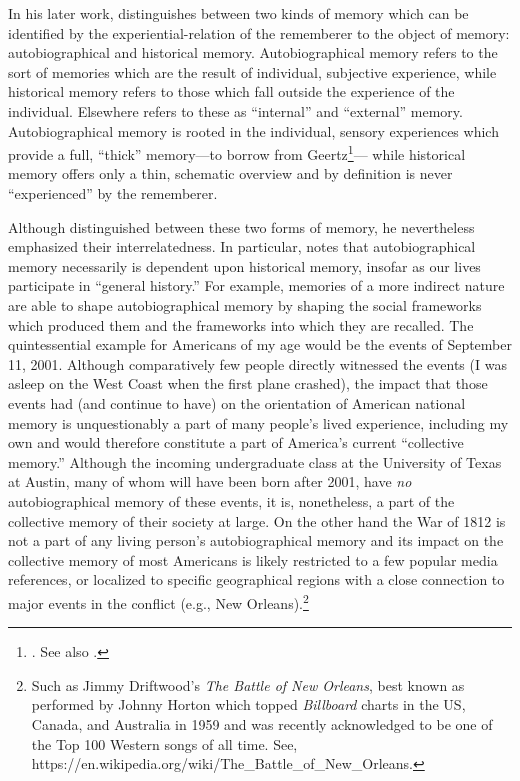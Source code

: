 In his later work, \halbwachs distinguishes between two kinds of memory which can be identified by the experiential-relation of the rememberer to the object of memory: autobiographical and historical memory.\autocite[52]{halbwachs1980} Autobiographical memory refers to the sort of memories which are the result of individual, subjective experience, while historical memory refers to those which fall outside the experience of the individual. Elsewhere \halbwachs refers to these as ``internal'' and ``external'' memory. Autobiographical memory is rooted in the individual, sensory experiences which provide a full, ``thick'' memory---to borrow from Geertz\footnote{\cite[3--30]{geertz1973}. See also \cite[189--192]{smith-riley2009}.}--- while historical memory offers only a thin, schematic overview and by definition is never ``experienced'' by the rememberer.  

Although \halbwachs distinguished between these two forms of memory, he nevertheless emphasized their interrelatedness. In particular, \halbwachs notes that autobiographical memory necessarily is dependent upon historical memory, insofar as our lives participate in ``general history.''\autocite[52]{halbwachs1980} For example, memories of a more indirect nature are able to shape autobiographical memory by shaping the social frameworks which produced them and the frameworks into which they are recalled. The quintessential example for Americans of my age would be the events of September 11, 2001. Although comparatively few people directly witnessed the events (I was asleep on the West Coast when the first plane crashed), the impact that those events had (and continue to have) on the orientation of American national memory is unquestionably a part of many people's lived experience, including my own and would therefore constitute a part of America's current ``collective memory.'' Although the incoming undergraduate class at the University of Texas at Austin, many of whom will have been born after 2001, have \emph{no} autobiographical memory of these events, it is, nonetheless, a part of the collective memory of their society at large. On the other hand the War of 1812 is not a part of any living person's autobiographical memory and its impact on the collective memory of most Americans is likely restricted to a few popular media references, or localized to specific geographical regions with a close connection to major events in the conflict (e.g., New Orleans).\footnote{Such as Jimmy Driftwood's \emph{The Battle of New   Orleans}, best known as performed by Johnny Horton which topped   \emph{Billboard} charts in the US, Canada, and Australia in 1959 and   was recently acknowledged to be one of the Top 100 Western songs of   all time. See,   https://en.wikipedia.org/wiki/The\_Battle\_of\_New\_Orleans.}  

